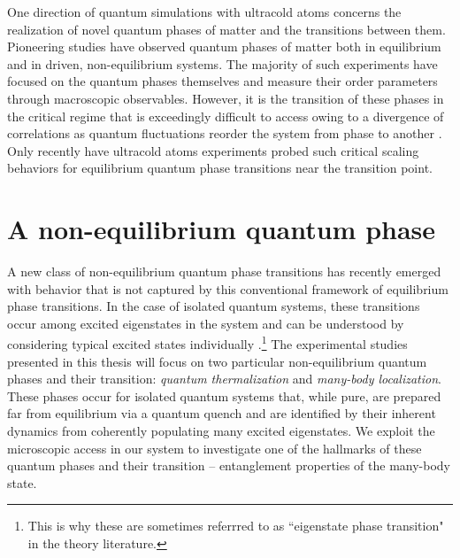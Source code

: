 One direction of quantum simulations with ultracold atoms concerns the realization of novel quantum phases of matter and the transitions between them. Pioneering studies have observed quantum phases of matter both in equilibrium \cite{Greiner2002,Jordens2008,Jo2009,Haller2010,Simon2011} and in driven, non-equilibrium\cite{Baumann2010,Landig2016,Choi2017,Leonard2017} systems. The majority of such experiments have focused on the quantum phases themselves and measure their order parameters through macroscopic observables. However, it is the transition of these phases in the critical regime that is exceedingly difficult to access owing to a divergence of correlations as quantum fluctuations reorder the system from phase to another \cite{Landau1937,Sachdev2011}. Only recently have ultracold atoms experiments probed such critical scaling behaviors for equilibrium quantum phase transitions near the transition point\cite{Anquez2016, Clark2016, Keesling2019}. 

\section{A non-equilibrium quantum phase}
 
A new class of non-equilibrium quantum phase transitions has recently emerged with behavior that is not captured by this conventional framework of equilibrium phase transitions. In the case of isolated quantum systems, these transitions occur among excited eigenstates in the system and can be understood by considering typical excited states individually  \cite{Nandkishore2015, Zvyagin2016, Tauber2017, Alet2018, Heyl2018}.\footnote{This is why these are sometimes referrred to as ``eigenstate phase transition" in the theory literature. } The experimental studies presented in this thesis will focus on two particular non-equilibrium quantum phases and their transition: \emph{quantum thermalization} and \emph{many-body localization}. These phases occur for isolated quantum systems that, while pure, are prepared far from equilibrium via a quantum quench\cite{Sakurai1993} and are identified by their inherent dynamics from coherently populating many excited eigenstates\cite{Nandkishore2015,DAlessio2016}. We exploit the microscopic access in our system to investigate one of the hallmarks of these quantum phases and their transition\cite{Amico2008,Bardarson2012, Nandkishore2015, DAlessio2016} -- entanglement properties of the many-body state. 

